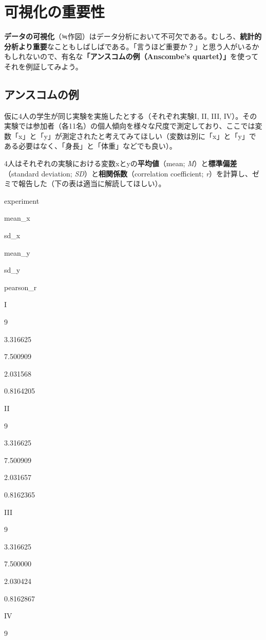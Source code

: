 \documentclass[]{book}
\begin{document}
\chapter{可視化の重要性}\label{introduction}

\textbf{データの可視化}（≒作図）はデータ分析において不可欠である。むしろ、\textbf{統計的分析より重要}なこともしばしばである。「言うほど重要か？」と思う人がいるかもしれないので、有名な\textbf{「アンスコムの例（Anscombe's
quartet）」}を使ってそれを例証してみよう。

\section{アンスコムの例}

仮に4人の学生が同じ実験を実施したとする（それぞれ実験I, II, III,
IV）。その実験では参加者（各11名）の個人傾向を様々な尺度で測定しており、ここでは変数「x」と「y」が測定されたと考えてみてほしい（変数は別に「x」と「y」である必要はなく、「身長」と「体重」などでも良い）。

4人はそれぞれの実験における変数xとyの\textbf{平均値}（mean;
\emph{M}）と\textbf{標準偏差}（standard deviation;
\emph{SD}）と\textbf{相関係数}（correlation coefficient;
\emph{r}）を計算し、ゼミで報告した（下の表は適当に解読してほしい）。

experiment

mean\_x

sd\_x

mean\_y

sd\_y

pearson\_r

I

9

3.316625

7.500909

2.031568

0.8164205

II

9

3.316625

7.500909

2.031657

0.8162365

III

9

3.316625

7.500000

2.030424

0.8162867

IV

9
\end{document}
